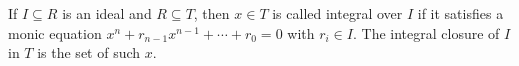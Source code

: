 If $I \subseteq R$ is an ideal and $R \subseteq T$, then $x \in T$ is
called integral over $I$ if it satisfies a monic equation
$x^n + r_{n-1}x^{n-1}+\cdots+r_0 = 0$ with $r_i \in I$. The integral closure
of $I$ in $T$ is the set of such $x$.
